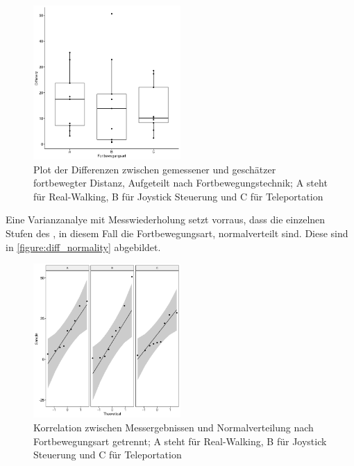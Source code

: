                    \begin{figure}[!h]
                        \centering
                        \includegraphics[width=0.5\textwidth]{plots/diff_plot.png}
                        \caption{Plot der Differenzen zwischen gemessener und geschätzer fortbewegter Distanz, Aufgeteilt nach Fortbewegungstechnik; A steht für Real-Walking, B für Joystick Steuerung und C für Teleportation}\label{figure:diff_plot}
                    \end{figure}

                    Eine Varianzanalye mit Messwiederholung setzt vorraus, dass die einzelnen Stufen des , in diesem Fall die Fortbewegungsart, normalverteilt sind. Diese sind in \autoref{figure:diff_normality} abgebildet.

                    \begin{figure}[!h]
                        \centering
                        \includegraphics[width=0.5\textwidth]{plots/diff_normality.png}
                        \caption{Korrelation zwischen Messergebnissen und Normalverteilung nach Fortbewegungsart getrennt; A steht für Real-Walking, B für Joystick Steuerung und C für Teleportation}\label{figure:diff_normality}
                    \end{figure}

